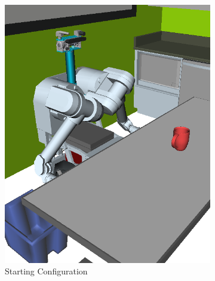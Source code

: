 \begin{figure}
\begin{widepage}
\centering

\begin{subfigure}[t]{0.185\linewidth}
\centering
\includegraphics[width=\columnwidth]{figs/testherb-a.png}
\caption{Starting Configuration}
\end{subfigure}
\begin{subfigure}[t]{0.185\linewidth}
\centering

\end{subfigure}
\end{widepage}
\end{figure}
